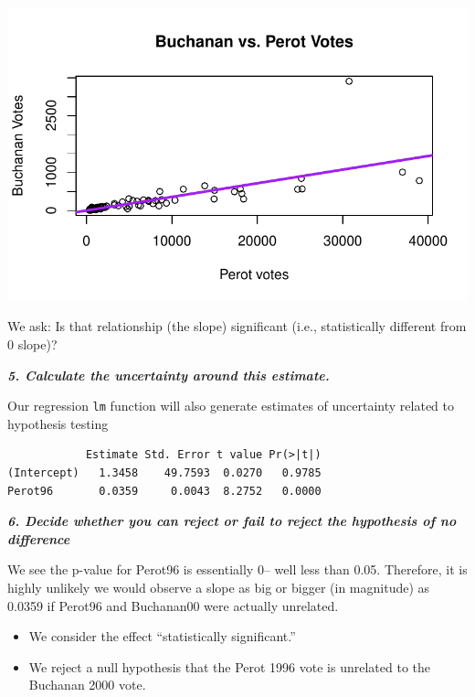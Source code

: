 \documentclass[
  letterpaper,
  DIV=11,
  numbers=noendperiod]{scrreprt}
\newenvironment{Shaded}{\begin{snugshade}}{\end{snugshade}}
\newcommand{\AttributeTok}[1]{\textcolor[rgb]{0.40,0.45,0.13}{#1}}
\newcommand{\DecValTok}[1]{\textcolor[rgb]{0.68,0.00,0.00}{#1}}
\newcommand{\FunctionTok}[1]{\textcolor[rgb]{0.28,0.35,0.67}{#1}}
\newcommand{\NormalTok}[1]{\textcolor[rgb]{0.00,0.23,0.31}{#1}}
\newcommand{\SpecialCharTok}[1]{\textcolor[rgb]{0.37,0.37,0.37}{#1}}
\providecommand{\tightlist}{%
  \setlength{\itemsep}{0pt}\setlength{\parskip}{0pt}}\usepackage{longtable,booktabs,array}
\begin{document}
\includegraphics{10-Uncertainty_files/figure-pdf/unnamed-chunk-8-1.pdf}

We ask: Is that relationship (the slope) significant (i.e.,
statistically different from 0 slope)?

\textbf{\emph{5. Calculate the uncertainty around this estimate.}}

Our regression \texttt{lm} function will also generate estimates of
uncertainty related to hypothesis testing

\begin{Shaded}
\end{Shaded}

\begin{verbatim}
            Estimate Std. Error t value Pr(>|t|)
(Intercept)   1.3458    49.7593  0.0270   0.9785
Perot96       0.0359     0.0043  8.2752   0.0000
\end{verbatim}

\textbf{\emph{6. Decide whether you can reject or fail to reject the
hypothesis of no difference}}

We see the p-value for Perot96 is essentially 0-- well less than 0.05.
Therefore, it is highly unlikely we would observe a slope as big or
bigger (in magnitude) as 0.0359 if Perot96 and Buchanan00 were actually
unrelated.

\begin{itemize}
\tightlist
\item
  We consider the effect ``statistically significant.''
\item
  We reject a null hypothesis that the Perot 1996 vote is unrelated to
  the Buchanan 2000 vote.
\end{itemize}
\end{document}
